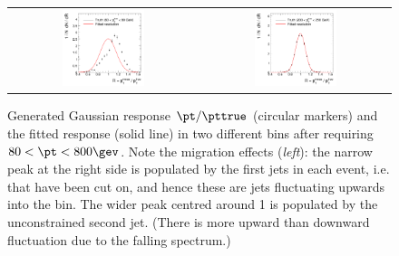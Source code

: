 \begin{figure}[ht]
  \centering
  \begin{tabular}{cc}
    \includegraphics[width=0.45\textwidth]{figures/resFit_ToyMC_PtCuts_ResolutionBin1} &
    \includegraphics[width=0.45\textwidth]{figures/resFit_ToyMC_PtCuts_ResolutionBin7} \\
  \end{tabular}
  \caption{Generated Gaussian response \mbox{$\pt / \pttrue$}
    (circular markers) and the fitted
    response (solid line) in two different \pttrue bins after
    requiring \mbox{$80 < \pt < 800\gev$}.
    Note the migration effects (\textit{left}): the narrow peak at the
    right side is populated by the first jets in each event, i.e. that have been cut on, and hence these are jets fluctuating upwards into the \pt bin.
    The wider peak centred around 1 is populated by the unconstrained
    second jet.
    (There is more upward than downward fluctuation due to the falling
    \pttrue spectrum.)
  }
  \label{fig:ResFit:ToyMC:PtCuts:Response}
\end{figure}

